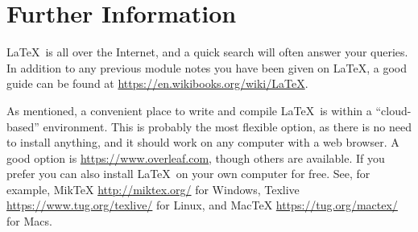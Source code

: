 \documentclass[10pt]{article}
\begin{document}
\section{Further Information}
\LaTeX\ is all over the Internet, and a quick search will often answer your queries. In addition to any previous module notes you have been given on \LaTeX, a good guide can be found at \url{https://en.wikibooks.org/wiki/LaTeX}. 

As mentioned, a convenient place to write and compile \LaTeX\ is within a ``cloud-based'' environment. This is probably the most flexible option, as there is no need to install anything, and it should work on any computer with a web browser. A good option is \url{https://www.overleaf.com}, though others are available. If you prefer you can also install \LaTeX\ on your own computer for free. See, for example, MikTeX \url{http://miktex.org/} for Windows, Texlive \url{https://www.tug.org/texlive/} for Linux, and MacTeX \url{https://tug.org/mactex/} for Macs.

\end{document}

